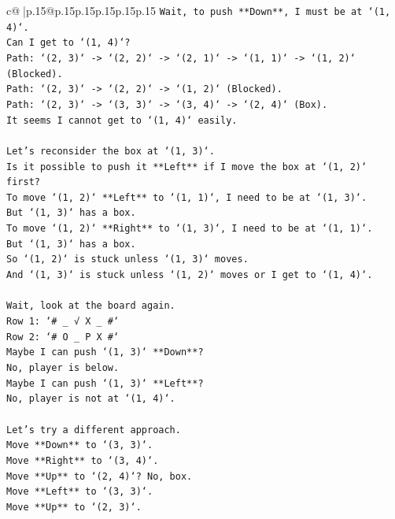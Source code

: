 \documentclass{article}
\begin{document}
{\begin{supertabular}{c@{$\;$}|p{.15\linewidth}@{}p{.15\linewidth}p{.15\linewidth}p{.15\linewidth}p{.15\linewidth}p{.15\linewidth}}
{{{\texttt{Wait, to push **Down**, I must be at `(1, 4)`.} \\
\texttt{Can I get to `(1, 4)`?} \\
\texttt{Path: `(2, 3)` {-}> `(2, 2)` {-}> `(2, 1)` {-}> `(1, 1)` {-}> `(1, 2)` (Blocked).} \\
\texttt{Path: `(2, 3)` {-}> `(2, 2)` {-}> `(1, 2)` (Blocked).} \\
\texttt{Path: `(2, 3)` {-}> `(3, 3)` {-}> `(3, 4)` {-}> `(2, 4)` (Box).} \\
\texttt{It seems I cannot get to `(1, 4)` easily.} \\
\\ 
\texttt{Let's reconsider the box at `(1, 3)`.} \\
\texttt{Is it possible to push it **Left** if I move the box at `(1, 2)` first?} \\
\texttt{To move `(1, 2)` **Left** to `(1, 1)`, I need to be at `(1, 3)`.} \\
\texttt{But `(1, 3)` has a box.} \\
\texttt{To move `(1, 2)` **Right** to `(1, 3)`, I need to be at `(1, 1)`.} \\
\texttt{But `(1, 3)` has a box.} \\
\texttt{So `(1, 2)` is stuck unless `(1, 3)` moves.} \\
\texttt{And `(1, 3)` is stuck unless `(1, 2)` moves or I get to `(1, 4)`.} \\
\\ 
\texttt{Wait, look at the board again.} \\
\texttt{Row 1: `\# \_ √ X \_ \#`} \\
\texttt{Row 2: `\# O \_ P X \#`} \\
\texttt{Maybe I can push `(1, 3)` **Down**?} \\
\texttt{No, player is below.} \\
\texttt{Maybe I can push `(1, 3)` **Left**?} \\
\texttt{No, player is not at `(1, 4)`.} \\
\\ 
\texttt{Let's try a different approach.} \\
\texttt{Move **Down** to `(3, 3)`.} \\
\texttt{Move **Right** to `(3, 4)`.} \\
\texttt{Move **Up** to `(2, 4)`? No, box.} \\
\texttt{Move **Left** to `(3, 3)`.} \\
\texttt{Move **Up** to `(2, 3)`.} \\
}}}
\end{supertabular}}
\end{document}

